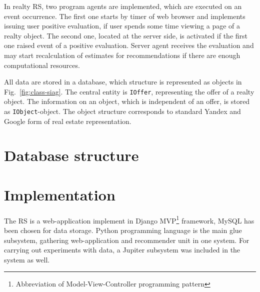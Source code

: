 \documentclass[conference,a4]{IEEEtran}
\begin{document}

In realty RS, two program agents are implemented, which are executed on an event occurrence.  The first one starts by timer of web browser and implements issuing user positive evaluation, if user spends some time viewing a page of a realty object.  The second one, located at the server side, is activated if the first one raised event of a positive evaluation.  Server agent receives the evaluation and may start recalculation of estimates for recommendations if there are enough computational resources.

All data are stored in a database, which structure is represented as objects in Fig.~\ref{fig:class-siag}.  The central entity is \texttt{IOffer}, representing the offer of a realty object.  The information on an object, which is independent of an offer, is stored as \texttt{IObject}-object.  The object structure corresponds to standard Yandex and Google form of real estate representation.


\section{Database structure}


\section{Implementation}

The RS is a web-application implement in Django MVP\footnote{Abbreviation of Model-View-Controller programming pattern} framework, MySQL has been chosen for data storage.  Python programming language is the main glue subsystem, gathering web-application and recommender unit in one system.  For carrying out experiments with data, a Jupiter subsystem was included in the system as well.
\end{document}
